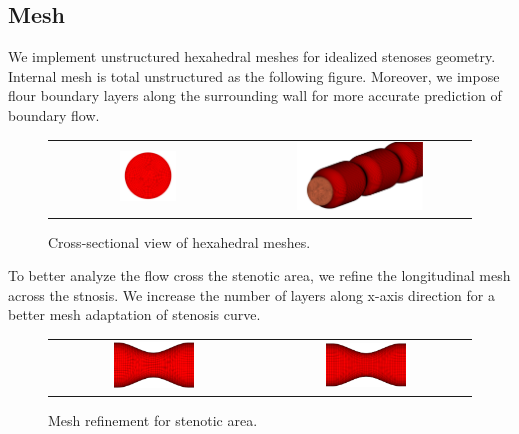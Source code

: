 \subsection{Mesh}
We implement unstructured hexahedral meshes for idealized stenoses geometry. Internal mesh is total unstructured as the following figure. Moreover, we impose flour boundary layers along the surrounding wall for more accurate prediction of boundary flow.

\begin{figure}[H]
	\centering
	\begin{tabular}{cc}
		\includegraphics[width=0.3\textwidth]{./pics/mesh1.png} & \includegraphics[width=0.6\textwidth]{./pics/mesh7.png}
	\end{tabular}
	\caption{\footnotesize Cross-sectional view of hexahedral meshes.}
\end{figure}

To better analyze the flow cross the stenotic area, we refine the longitudinal mesh across the stnosis. We increase the number of layers along x-axis direction for a better mesh adaptation of stenosis curve.

\begin{figure}[H]
	\centering
	\begin{tabular}{cc}
		\includegraphics[width=0.4\textwidth]{./pics/refine1.png} & \includegraphics[width=0.4\textwidth]{./pics/refine2.png}
	\end{tabular}
	\caption{\footnotesize Mesh refinement for stenotic area.}
\end{figure}

